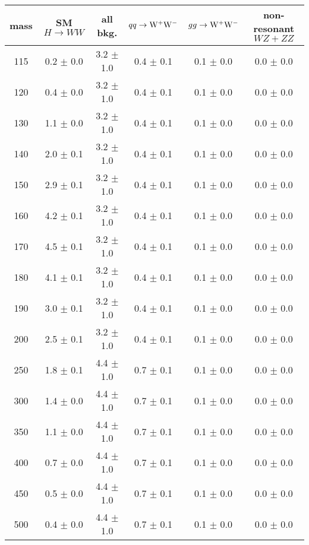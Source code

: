 \begin{table}[!ht]
  \begin{center}
 {\normalsize
  \begin{tabular} {|c|c|c|c|c|c|}
\hline
  mass    & SM $H\to WW$ & all bkg. & $qq \to \mathrm{W}^+\mathrm{W}^-$ & $gg \to \mathrm{W}^+\mathrm{W}^-$ & non-resonant $WZ+ZZ$ \\
  \hline
  \hline
115 & 0.2 $\pm$        0.0 &  3.2    $\pm$    1.0 &  0.4 $\pm$   0.1 & 0.1 $\pm$   0.0 &  0.0 $\pm$   0.0 \\
120 & 0.4 $\pm$        0.0 &  3.2    $\pm$    1.0 &  0.4 $\pm$   0.1 & 0.1 $\pm$   0.0 &  0.0 $\pm$   0.0 \\
130 & 1.1 $\pm$        0.0 &  3.2    $\pm$    1.0 &  0.4 $\pm$   0.1 & 0.1 $\pm$   0.0 &  0.0 $\pm$   0.0 \\
140 & 2.0 $\pm$        0.1 &  3.2    $\pm$    1.0 &  0.4 $\pm$   0.1 & 0.1 $\pm$   0.0 &  0.0 $\pm$   0.0 \\
150 & 2.9 $\pm$        0.1 &  3.2    $\pm$    1.0 &  0.4 $\pm$   0.1 & 0.1 $\pm$   0.0 &  0.0 $\pm$   0.0 \\
160 & 4.2 $\pm$        0.1 &  3.2    $\pm$    1.0 &  0.4 $\pm$   0.1 & 0.1 $\pm$   0.0 &  0.0 $\pm$   0.0 \\
170 & 4.5 $\pm$        0.1 &  3.2    $\pm$    1.0 &  0.4 $\pm$   0.1 & 0.1 $\pm$   0.0 &  0.0 $\pm$   0.0 \\
180 & 4.1 $\pm$        0.1 &  3.2    $\pm$    1.0 &  0.4 $\pm$   0.1 & 0.1 $\pm$   0.0 &  0.0 $\pm$   0.0 \\
190 & 3.0 $\pm$        0.1 &  3.2    $\pm$    1.0 &  0.4 $\pm$   0.1 & 0.1 $\pm$   0.0 &  0.0 $\pm$   0.0 \\
200 & 2.5 $\pm$        0.1 &  3.2    $\pm$    1.0 &  0.4 $\pm$   0.1 & 0.1 $\pm$   0.0 &  0.0 $\pm$   0.0 \\
250 & 1.8 $\pm$        0.1 &  4.4    $\pm$    1.0 &  0.7 $\pm$   0.1 & 0.1 $\pm$   0.0 &  0.0 $\pm$   0.0 \\
300 & 1.4 $\pm$        0.0 &  4.4    $\pm$    1.0 &  0.7 $\pm$   0.1 & 0.1 $\pm$   0.0 &  0.0 $\pm$   0.0 \\
350 & 1.1 $\pm$        0.0 &  4.4    $\pm$    1.0 &  0.7 $\pm$   0.1 & 0.1 $\pm$   0.0 &  0.0 $\pm$   0.0 \\
400 & 0.7 $\pm$        0.0 &  4.4    $\pm$    1.0 &  0.7 $\pm$   0.1 & 0.1 $\pm$   0.0 &  0.0 $\pm$   0.0 \\
450 & 0.5 $\pm$        0.0 &  4.4    $\pm$    1.0 &  0.7 $\pm$   0.1 & 0.1 $\pm$   0.0 &  0.0 $\pm$   0.0 \\
500 & 0.4 $\pm$        0.0 &  4.4    $\pm$    1.0 &  0.7 $\pm$   0.1 & 0.1 $\pm$   0.0 &  0.0 $\pm$   0.0 \\

\end{tabular}}
\end{center}
\end{table}
